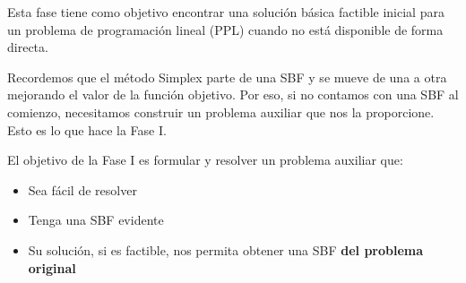 Esta fase tiene como objetivo encontrar una solución básica factible inicial para un problema de programación lineal (PPL) cuando no está disponible de forma directa.

Recordemos que el método Simplex parte de una SBF y se mueve de una a otra mejorando el valor de la función objetivo. Por eso, si no contamos con una SBF al comienzo, necesitamos construir un problema auxiliar que nos la proporcione. Esto es lo que hace la Fase I.

El objetivo de la Fase I es formular y resolver un problema auxiliar que:
\begin{itemize}
  \item Sea fácil de resolver
  \item Tenga una SBF evidente
  \item Su solución, si es factible, nos permita obtener una SBF \textbf{del problema original}
\end{itemize}

